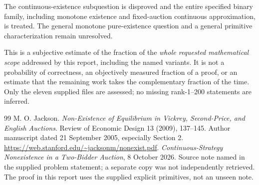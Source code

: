 \documentclass[11pt,a4paper]{article}
\theoremstyle{remark}\newtheorem{remark}[theorem]{Remark}
\begin{document}
The continuous-existence subquestion is disproved and the entire specified binary family, including monotone existence and fixed-auction continuous approximation, is treated. The general monotone pure-existence question and a general primitive characterization remain unresolved.

This is a subjective estimate of the fraction of the \emph{whole requested mathematical scope} addressed by this report, including the named variants. It is not a probability of correctness, an objectively measured fraction of a proof, or an estimate that the remaining work takes the complementary fraction of the time. Only the eleven supplied files are assessed; no missing rank-1--200 statements are inferred.

\begin{thebibliography}{99}
 M. O. Jackson. \emph{Non-Existence of Equilibrium in Vickrey, Second-Price, and English Auctions}. Review of Economic Design 13 (2009), 137--145. Author manuscript dated 21 September 2005, especially Section 2. \url{https://web.stanford.edu/~jacksonm/nonexist.pdf}.
 \emph{Continuous-Strategy Nonexistence in a Two-Bidder Auction}, 8 October 2026. Source note named in the supplied problem statement; a separate copy was not independently retrieved. The proof in this report uses the supplied explicit primitives, not an unseen note.
\end{thebibliography}
\end{document}
